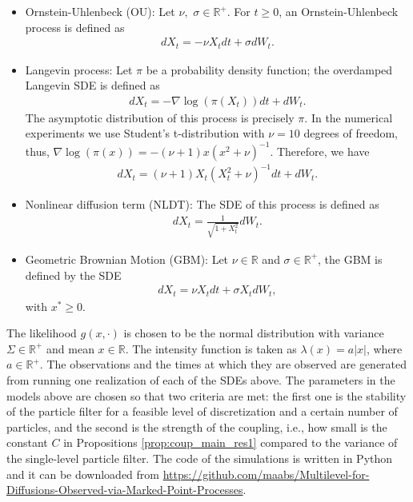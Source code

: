 \documentclass[english]{article}
\begin{document}
\begin{itemize}
	\item Ornstein-Uhlenbeck (OU):
	Let $\nu,$ $\sigma\in \mathbb{R}^+$. For $t\geq 0$, an Ornstein-Uhlenbeck process is defined as
	\begin{align}
	\label{eq:model1}
	dX_{t}=-\nu X_tdt+\sigma dW_t.
	\end{align}
	\item Langevin process: 
	Let $\pi$ be a probability density function; the overdamped Langevin SDE is defined as 
	\begin{align*}
	dX_{t}=-\nabla \log\left(\pi( X_t)\right)dt+ dW_t.
	\end{align*}
	The asymptotic distribution of this process is precisely $\pi$. In the numerical experiments we use Student's t-distribution with $\nu=10$ degrees of freedom, thus, $\nabla \log(\pi(x))=-(\nu+1)x(x^2+\nu)^{-1}$. Therefore, we have
\begin{align}
\label{eq:model2}
dX_{t}=(\nu+1)X_t(X_t^2+\nu)^{-1} dt+ dW_t.
\end{align}

	\item Nonlinear diffusion term (NLDT): The SDE of this process is defined as 
	\begin{align}
	\label{eq:model3}
	dX_{t}= \frac{1}{\sqrt{1+X_t^2}} dW_t.
	\end{align}
	\item Geometric Brownian Motion (GBM): Let $\nu\in \mathbb{R}$ and $\sigma\in \mathbb{R}^+$, the GBM is defined by the SDE
	\begin{align}
	\label{eq:model4}
	dX_{t}=\nu X_tdt+\sigma X_t dW_t,
	\end{align}
	with $x^*\geq0$.
\end{itemize}

The likelihood $g(x,\cdot)$ is chosen to be the normal distribution with variance $\Sigma\in \mathbb{R}^{+}$ and mean $x \in \mathbb{R}$. The intensity function is taken as $\lambda(x)=a|x|$, where $a\in \mathbb{R}^+$. The observations and the times at which they are observed are generated from running one realization of each of the SDEs above. The parameters in the models above are chosen so that two criteria are met: the first one is the stability of the particle filter for a feasible level of discretization and a certain number of particles, and the second is the strength of the coupling, i.e., how small is the constant $C$ in Propositions \ref{prop:coup_main_res1} compared to the variance of the single-level particle filter. The code of the simulations is written in Python and it can be downloaded from \href{https://github.com/maabs/Multilevel-for-Diffusions-Observed-via-Marked-Point-Processes}{https://github.com/maabs/Multilevel-for-Diffusions-Observed-via-Marked-Point-Processes}.
\end{document}
